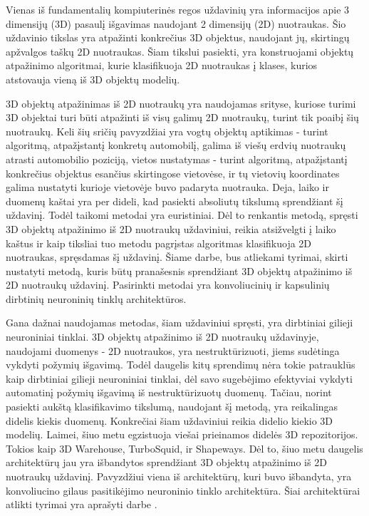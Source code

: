 
Vienas iš fundamentalių kompiuterinės regos uždavinių yra informacijos apie 3 dimensijų (3D) pasaulį išgavimas naudojant 2 dimensijų (2D) nuotraukas. Šio uždavinio tikslas yra atpažinti konkrečius 3D objektus, naudojant jų, skirtingų apžvalgos taškų 2D nuotraukas. Šiam tikslui pasiekti, yra konstruojami objektų atpažinimo algoritmai, kurie klasifikuoja 2D nuotraukas į klases, kurios atstovauja vieną iš 3D objektų modelių.

3D objektų atpažinimas iš 2D nuotraukų yra naudojamas srityse, kuriose turimi 3D objektai turi būti atpažinti iš visų galimų 2D nuotraukų, turint tik poaibį šių nuotraukų. Keli šių sričių pavyzdžiai yra vogtų objektų aptikimas - turint algoritmą, atpažįstantį konkretų automobilį, galima iš viešų erdvių nuotraukų atrasti automobilio poziciją, vietos nustatymas - turint algoritmą, atpažįstantį konkrečius objektus esančius skirtingose vietovėse, ir tų vietovių koordinates galima nustatyti kurioje vietovėje buvo padaryta nuotrauka. Deja, laiko ir duomenų kaštai yra per dideli, kad pasiekti absoliutų tikslumą sprendžiant šį uždavinį. Todėl taikomi metodai yra euristiniai. Dėl to renkantis metodą, spręsti 3D objektų atpažinimo iš 2D nuotraukų uždaviniui, reikia atsižvelgti į laiko kaštus ir kaip tiksliai tuo metodu pagrįstas algoritmas klasifikuoja 2D nuotraukas, spręsdamas šį uždavinį. Šiame darbe, bus atliekami tyrimai, skirti nustatyti metodą, kuris būtų pranašesnis sprendžiant 3D objektų atpažinimo iš 2D nuotraukų uždavinį. Pasirinkti metodai yra konvoliucinių ir kapsulinių dirbtinių neuroninių tinklų architektūros.

Gana dažnai naudojamas metodas, šiam uždaviniui spręsti, yra dirbtiniai gilieji neuroniniai tinklai. 3D objektų atpažinimo iš 2D nuotraukų uždavinyje, naudojami duomenys - 2D nuotraukos, yra nestruktūrizuoti, jiems sudėtinga vykdyti požymių išgavimą. Todėl daugelis kitų sprendimų nėra tokie patrauklūs kaip dirbtiniai gilieji neuroniniai tinklai, dėl savo sugebėjimo efektyviai vykdyti automatinį požymių išgavimą iš nestruktūrizuotų duomenų. Tačiau, norint pasiekti aukštą klasifikavimo tikslumą, naudojant šį metodą, yra reikalingas didelis kiekis duomenų. Konkrečiai šiam uždaviniui reikia didelio kiekio 3D modelių. Laimei, šiuo metu egzistuoja viešai prieinamos didelės 3D repozitorijos. Tokios kaip 3D Warehouse, TurboSquid, ir Shapeways. Dėl to, šiuo metu daugelis architektūrų jau yra išbandytos sprendžiant 3D objektų atpažinimo iš 2D nuotraukų uždavinį. Pavyzdžiui viena iš architektūrų, kuri buvo išbandyta, yra konvoliucino gilaus pasitikėjimo neuroninio tinklo architektūra. Šiai architektūrai atlikti tyrimai yra aprašyti darbe \cite{dbnExp}.

